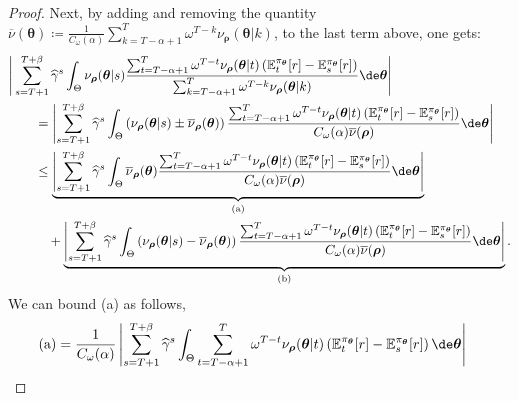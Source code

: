 \begin{proof}
Next, by adding and removing the quantity $\textstyle\overline{\nu}(\boldsymbol\theta) \coloneq \frac{1}{C_{\omega}(\alpha)} \sum_{k=T-\alpha+1}^T \omega^{T-k} \nu_{\boldsymbol\rho}(\boldsymbol\theta|k)$, to the last term above, one gets:
\begin{align*}
   &\Bigg| \sum_{s=T+1}^{T+\beta} \widehat{\gamma}^s \int_{\Theta}  \nu_{\boldsymbol\rho}(\boldsymbol\theta|s) \frac{\sum_{t=T-\alpha+1}^T \omega^{T-t} \nu_{\boldsymbol\rho}(\boldsymbol\theta|t) \left(\mathbb{E}_t^{\pi_{\boldsymbol\theta}}[r] - \mathbb{E}_s^{\pi_{\boldsymbol\theta}}[r] \right) }{\sum_{k=T-\alpha+1}^T \omega^{T-k} \nu_{\boldsymbol\rho}(\boldsymbol\theta|k)} \de \boldsymbol\theta  \Bigg|  \\
   &\qquad = \left| \sum_{s=T+1}^{T+\beta} \widehat{\gamma}^s \int_{\Theta}  \left(\nu_{\boldsymbol\rho}(\boldsymbol\theta|s) \pm \overline{\nu}_{\boldsymbol\rho}(\boldsymbol\theta)\right) \frac{\sum_{t=T-\alpha+1}^T \omega^{T-t} \nu_{\boldsymbol\rho}(\boldsymbol\theta|t)  \left(\mathbb{E}_t^{\pi_{\boldsymbol\theta}}[r] - \mathbb{E}_s^{\pi_{\boldsymbol\theta}}[r] \right) }{C_\omega(\alpha) \overline{\nu}(\boldsymbol\rho)} \de \boldsymbol\theta  \right|\\
    &\qquad \le \underbrace{\left| \sum_{s=T+1}^{T+\beta} \widehat{\gamma}^s \int_{\Theta}  \overline{\nu}_{\boldsymbol\rho}(\boldsymbol\theta)  \frac{\sum_{t=T-\alpha+1}^T \omega^{T-t} {\nu}_{\boldsymbol\rho}(\boldsymbol\theta|t) \left(\mathbb{E}_t^{\pi_{\boldsymbol\theta}}[r] - \mathbb{E}_s^{\pi_{\boldsymbol\theta}}[r] \right) }{C_\omega(\alpha) \overline{\nu}(\boldsymbol\rho)} \de \boldsymbol\theta  \right|}_{\text{(a)}} \\
    &\qquad \quad + \underbrace{\left| \sum_{s=T+1}^{T+\beta} \widehat{\gamma}^s \int_{\Theta}  \left(\nu_{\boldsymbol\rho}(\boldsymbol\theta|s) - \overline{\nu}_{\boldsymbol\rho}(\boldsymbol\theta)\right) \frac{\sum_{t=T-\alpha+1}^T \omega^{T-t} \nu_{\boldsymbol\rho}(\boldsymbol\theta|t) \left(\mathbb{E}_t^{\pi_{\boldsymbol\theta}}[r] - \mathbb{E}_s^{\pi_{\boldsymbol\theta}}[r] \right) }{C_\omega(\alpha) \overline{\nu}(\boldsymbol\rho)} \de \boldsymbol\theta  \right|}_{\text{(b)}}.
\end{align*}
We can bound (a) as follows,
\begin{align}
    \text{(a)} & = \frac{1}{C_\omega(\alpha)} \left| \sum_{s=T+1}^{T+\beta} \widehat{\gamma}^s \int_{\Theta}  \sum_{t=T-\alpha+1}^T \omega^{T-t} {\nu}_{\boldsymbol\rho}(\boldsymbol\theta|t) \left(\mathbb{E}_t^{\pi_{\boldsymbol\theta}}[r] - \mathbb{E}_s^{\pi_{\boldsymbol\theta}}[r] \right) \de \boldsymbol\theta  \right| 

\end{align}
\end{proof}
